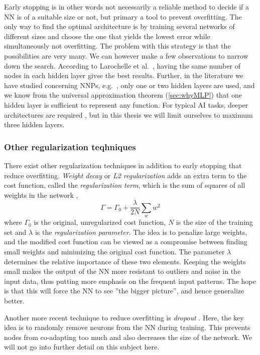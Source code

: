 \documentclass[twoside,english]{uiofysmaster}
\begin{document}
Early stopping is in other words not necessarily a reliable method to decide if a NN is of a suitable size or not, 
but primary a tool to prevent overfitting. 
The only way to find the optimal architecture is by training several networks of different sizes and choose the one that yields
the lowest error while simultaneously not overfitting. The problem with this strategy is that the possibilities are very many. 
We can however make a few observations to narrow down the search. 
According to Larochelle et al.\ \cite{Larochelle09}, having the same number of nodes in each hidden layer givse the best results. 
Further, in the literature we have studied concerning NNPs, e.g.\ \cite{Behler07,Raff05,Witkoskie05}, 
only one or two hidden layers are used, and we know from the universal approximation theorem (\autoref{sec:whyMLP})
that one hidden layer is sufficient to represent any function. For typical AI tasks, deeper architectures are required 
\cite{Bengio07}, but in this thesis we will limit ourselves to maximum three hidden layers. 

\subsubsection{Other regularization teqhniques}
There exist other regularization techniques in addition to early stopping that reduce overfitting. 
\textit{Weight decay} or \textit{L2 regularization} adds an extra term to the cost function, called 
the \textit{regularization term}, which is the sum of squares of all weights in the network \cite{Krogh1992},
\begin{equation}
 \Gamma = \Gamma_0 + \frac{\lambda}{2N}\sum_w w^2
\end{equation}
where $\Gamma_0$ is the original, unregularized cost function, $N$ is the size of the training set and 
$\lambda$ is the \textit{regularization parameter}. The idea is to penalize large weights, and the modified 
cost function can be viewed as a compromise between finding small weights and minimizing the original cost function.
The parameter $\lambda$ determines the relative importance of these two elements. 
Keeping the weights small makes the output of the NN more resistant to outliers and noise in the input data, thus
putting more emphasis on the frequent input patterns. 
The hope is that this will force the NN to see ''the bigger picture'', 
and hence generalize better. 

Another more recent technique to reduce overfitting is \textit{dropout} \cite{Srivastava14}. Here, the key idea 
is to randomly remove neurons from the NN during training. This prevents nodes from co-adapting too much and 
also decreases the size of the network. We will not go into further detail on this subject here. 
\end{document}
